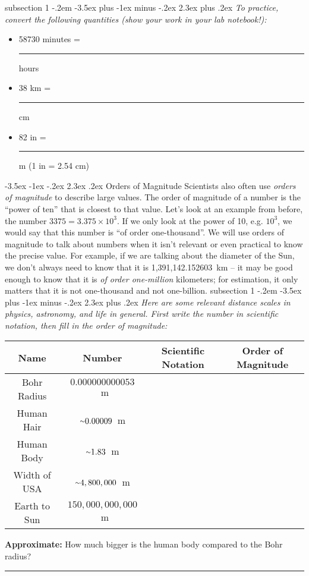 \documentclass[12pt]{article}
\makeatletter
\newcommand{\apwsim}{\raisebox{0.2ex}{\scriptsize$\sim$\normalsize}}
\newenvironment{problem}{\@startsection
       {subsection}
       {1}
       {-.2em}
       {-3.5ex plus -1ex minus -.2ex}
       {2.3ex plus .2ex}
       {\pagebreak[3]%
       \normalsize\bf\noindent{Problem }
       }
       }
       {%
       }
\renewcommand\section{\@startsection{section}{1}{\z@}%
                                  {-3.5ex \@plus -1ex \@minus -.2ex}%
                                  {2.3ex \@plus.2ex}%
                                  {\normalfont\large\bfseries}}
\makeatother
\begin{document}
\begin{problem}{ }
	\emph{To practice, convert the following quantities (show your work in your lab notebook!):}
	\begin{itemize}
	\item{58730} minutes =  \rule{2cm}{0.75pt} hours
	\item{38} km =  \rule{2cm}{0.75pt} cm
	\item{82} in =  \rule{2cm}{0.75pt} m (1 in = 2.54 cm)
	\end{itemize}
\end{problem}

%
%
\section{Orders of Magnitude}
\indent\indent Scientists also often use \emph{orders of magnitude} to describe large values. The order of magnitude of a number is the ``power of ten'' that is closest to that value. Let's look at an example from before, the number $3375 = 3.375\times10^3$. If we only look at the power of 10, e.g. $10^3$, we would say that this number is ``of order one-thousand''. We will use orders of magnitude to talk about numbers when it isn't relevant or even practical to know the precise value. For example, if we are talking about the diameter of the Sun, we don't always need to know that it is 1,391,142.152603~km -- it may be good enough to know that it is \emph{of order one-million} kilometers; for estimation, it only matters that it is not one-thousand and not one-billion.
\clearpage
\begin{problem}{ }
\emph{Here are some relevant distance scales in physics, astronomy, and life in general. First write the number in scientific notation, then fill in the order of magnitude:}
\begin{center}
	\def\arraystretch{1.5}
	\begin{tabular}{| c | c | c | c |}
		\hline
		\textbf{Name} & \textbf{Number} & \textbf{Scientific Notation} & \textbf{Order of Magnitude} \\ \hline 
		Bohr Radius & $0.000000000053$~m &  &  \\ \hline 
		Human Hair & $\apwsim0.00009$~m &  &  \\ \hline 
		Human Body & $\apwsim1.83$~m &  &  \\ \hline 
		Width of USA & $\apwsim4,800,000$~m &  &  \\ \hline
		Earth to Sun & $150,000,000,000$~m &  &  \\ \hline
	\end{tabular}\linebreak\linebreak
	
	\noindent\textbf{Approximate:} How much bigger is the human body compared to the Bohr radius?\linebreak\linebreak\linebreak
	 \rule{15cm}{0.75pt}\linebreak
	 
\end{center}
\end{problem}
\end{document}
